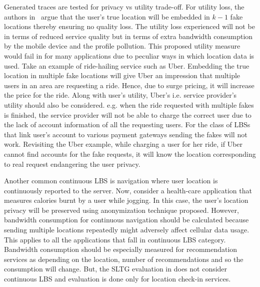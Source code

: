 \documentclass[USenglish,oneside,twocolumn]{article}
\begin{document}
Generated traces are tested for privacy vs utility trade-off. For utility loss, the authors in~\cite{vincent} argue that the user's true location will be embedded in $k-1$ fake locations thereby ensuring no quality loss. The utility loss experienced will not be in terms of reduced service quality but in terms of extra bandwidth consumption by the mobile device and the profile pollution\cite{vincent}. This proposed utility measure would fail in for many applications due to peculiar ways in which location data is used. Take an example of ride-hailing service such as Uber. Embedding the true location in multiple fake locations will give Uber an impression that multiple users in an area are requesting a ride. Hence, due to surge pricing, it will increase the price for the ride. Along with user's utility, Uber's i.e. service provider's utility should also be considered. e.g. when the ride requested with multiple fakes is finished, the service provider will not be able to charge the correct user due to the lack of account information of all the requesting users. For the class of LBSs that link user's account to various payment gateways sending the fakes will not work. Revisiting the Uber example, while charging a user for her ride, if Uber cannot find accounts for the fake requests, it will know the location corresponding to real request endangering the user privacy. 

Another common continuous LBS is navigation where user location is continuously reported to the server. Now, consider a health-care application that measures calories burnt by a user while jogging. In this case, the user's location privacy will be preserved using anonymization technique proposed. However, bandwidth consumption for continuous navigation should be calculated because sending multiple locations repeatedly might adversely affect cellular data usage. This applies to all the applications that fall in continuous LBS category. Bandwidth consumption should be especially measured for recommendation services as depending on the location, number of recommendations and so the consumption will change. But, the SLTG evaluation in \cite{vincent} does not consider continuous LBS and evaluation is done only for location check-in services.
\end{document}
